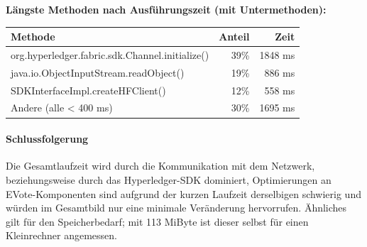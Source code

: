 \documentclass[parskip=full]{scrartcl}
\begin{document}
\textbf{Längste Methoden nach Ausführungszeit (mit Untermethoden):}
\begin{table}[h!]
	\begin{tabular}[t]{lrr}
		Methode & Anteil & Zeit \\ \hline
		org.hyperledger.fabric.sdk.Channel.initialize() & 39\% & 1848 ms \\
		java.io.ObjectInputStream.readObject() & 19\% & 886 ms \\
		SDKInterfaceImpl.createHFClient() & 12\% & 558 ms \\
		Andere (alle < 400 ms) & 30\% & 1695 ms 
	\end{tabular}
\end{table}

\paragraph{Schlussfolgerung}
Die Gesamtlaufzeit wird durch die Kommunikation mit dem Netzwerk, beziehungsweise durch das Hyperledger-SDK dominiert, Optimierungen an EVote-Komponenten sind aufgrund der kurzen Laufzeit derselbigen schwierig und würden im Gesamtbild nur eine minimale Veränderung hervorrufen. Ähnliches gilt für den Speicherbedarf; mit 113 MiByte ist dieser selbst für einen Kleinrechner angemessen.
\end{document}
